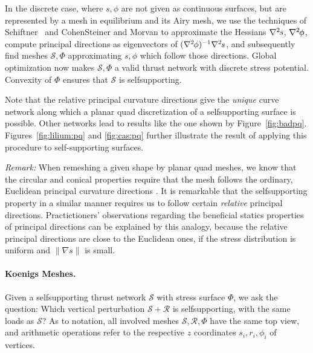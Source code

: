 \documentclass[review]{acmsiggraph}
\def\ess{s}
\def\Hess#1{{\def\testess{#1}\nabla^2\ifx\testess\ess\!s\else #1\fi}}
\def\Hess#1{\text{$\nabla^2\hskip-.2ex #1$}}
\def\SS{{\mathcal S}}
\def\RR{{\mathcal R}}
\begin{document}
In the discrete case, where $s,\phi$ are not given as continuous surfaces, 
but are represented by a mesh in equilibrium and its Airy mesh, we use the 
techniques of Schiftner~ and Cohen\dash Steiner 
and Morvan  to approximate the Hessians 
$\Hess s$, $\Hess\phi$, compute principal directions as eigenvectors of 
$(\Hess\phi)^{-1}\Hess s$, and subsequently find meshes $\SS,\Phi$ 
approximating $s,\phi$ which follow those directions. Global optimization 
now makes $\SS,\Phi$ a valid thrust network with discrete stress 
potential. Convexity of $\Phi$ ensures that $\SS$ is self\dash supporting.


Note that the relative principal curvature directions give the 
\emph{unique} curve network along which a planar quad discretization of a 
self\dash supporting surface is possible. Other networks lead to results
like the one shown by Figure~\ref{fig:badpq}.
Figures~\ref{fig:lilium:pq} and \ref{fig:cas:pq} 
further illustrate the result of applying this procedure to 
self-supporting surfaces.




{\em Remark:} When remeshing a given shape by planar quad meshes, we know
that the circular and conical properties require that the mesh follows the
ordinary, Euclidean principal curvature directions \cite{Liu2006}. It is
remarkable that the self\dash supporting property in a similar manner
requires us to follow certain {\em relative} principal directions.
Practictioners' observations regarding the beneficial statics properties
of principal directions can be explained by this analogy, because the
relative principal directions are close to the Euclidean ones, if the
stress distribution is uniform and $\|\nabla s\|$ is small.



\paragraph{Koenigs Meshes.}

Given a self\dash supporting thrust network $\SS$ with stress surface
$\Phi$, we ask the question:
Which vertical perturbation $\SS+\RR$ is self\dash supporting, with the same
loads as $\SS$? As to notation, all involved meshes $\SS,\RR,\Phi$ have the
same top view, and arithmetic operations refer to the respective $z$
coordinates
$s_i,r_i,\phi_i$ of vertices.
\end{document}
